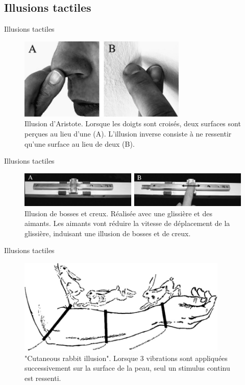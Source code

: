 \subsection{Illusions tactiles}
{
\begin{frame}{Illusions tactiles}
\begin{figure}
\centering
\includegraphics[width=8cm]{images/illusions_aristote}
\caption{Illusion d'Aristote. Lorsque les doigts sont croisés, deux surfaces sont perçues au lieu d'une (A). L'illusion inverse consiste à ne ressentir qu'une surface au lieu de deux (B).}
\end{figure}
\end{frame}

\begin{frame}{Illusions tactiles}
\begin{figure}
\centering
\includegraphics[width=\linewidth]{images/illusions_bump}
\caption{Illusion de bosses et creux. Réalisée avec une glissière et des aimants. Les aimants vont réduire la vitesse de déplacement de la glissière, induisant une illusion de bosses et de creux.}
\end{figure}
\end{frame}
}

{
\begin{frame}{Illusions tactiles}
\begin{figure}
\centering
\includegraphics[width=10cm]{images/illusions_rabbit}
\caption{"Cutaneous rabbit illusion". Lorsque 3 vibrations sont appliquées successivement sur la surface de la peau, seul un stimulus continu est ressenti.}
\end{figure}
\end{frame}
}

